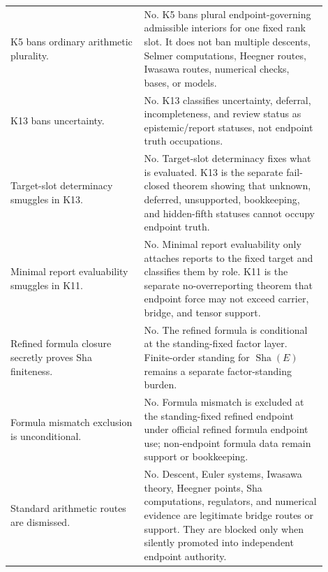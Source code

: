 \documentclass[11pt]{article}
\newcommand{\Sha}{\operatorname{Sha}}
\begin{document}
\begin{longtable}{L{0.38\linewidth}L{0.52\linewidth}}
K5 bans ordinary arithmetic plurality. & No. K5 bans plural endpoint-governing admissible interiors for one fixed rank slot. It does not ban multiple descents, Selmer computations, Heegner routes, Iwasawa routes, numerical checks, bases, or models.\\
K13 bans uncertainty. & No. K13 classifies uncertainty, deferral, incompleteness, and review status as epistemic/report statuses, not endpoint truth occupations.\\
Target-slot determinacy smuggles in K13. & No. Target-slot determinacy fixes what is evaluated. K13 is the separate fail-closed theorem showing that unknown, deferred, unsupported, bookkeeping, and hidden-fifth statuses cannot occupy endpoint truth.\\
Minimal report evaluability smuggles in K11. & No. Minimal report evaluability only attaches reports to the fixed target and classifies them by role. K11 is the separate no-overreporting theorem that endpoint force may not exceed carrier, bridge, and tensor support.\\
Refined formula closure secretly proves Sha finiteness. & No. The refined formula is conditional at the standing-fixed factor layer. Finite-order standing for $\Sha(E)$ remains a separate factor-standing burden.\\
Formula mismatch exclusion is unconditional. & No. Formula mismatch is excluded at the standing-fixed refined endpoint under official refined formula endpoint use; non-endpoint formula data remain support or bookkeeping.\\
Standard arithmetic routes are dismissed. & No. Descent, Euler systems, Iwasawa theory, Heegner points, Sha computations, regulators, and numerical evidence are legitimate bridge routes or support. They are blocked only when silently promoted into independent endpoint authority.\\
\bottomrule
\end{longtable}
\end{document}
